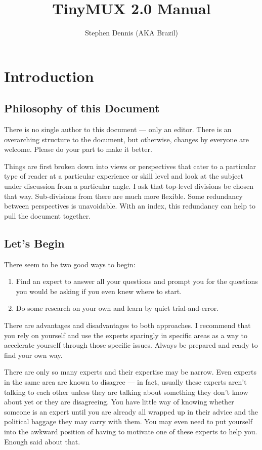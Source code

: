 \documentclass[letterpaper]{book}
\title{TinyMUX 2.0 Manual}
\author{Stephen Dennis (AKA Brazil)}
\begin{document}
\maketitle
\chapter{Introduction}
\section{Philosophy of this Document}
There is no single author to this document --- only an editor. There is an
overarching structure to the document, but otherwise, changes by everyone are
welcome. Please do your part to make it better.

Things are first broken down into views or perspectives that cater to a
particular type of reader at a particular experience or skill level and look
at the subject under discussion from a particular angle. I ask that top-level
divisions be chosen that way. Sub-divisions from there are much more flexible.
Some redundancy between perspectives is unavoidable. With an index, this
redundancy can help to pull the document together.
\section{Let's Begin}
There seem to be two good ways to begin:
\begin{enumerate}
\item
Find an expert to answer all your questions and prompt you for the questions
you would be asking if you even knew where to start.
\item
Do some research on your own and learn by quiet trial-and-error.
\end{enumerate}
There are advantages and disadvantages to both approaches. I recommend that
you rely on yourself and use the experts sparingly in specific areas as a way
to accelerate yourself through those specific issues. Always be prepared and
ready to find your own way.

There are only so many experts and their expertise may be narrow. Even experts
in the same area are known to disagree --- in fact, usually these experts
aren't talking to each other unless they are talking about something they don't
know about yet or they are disagreeing. You have little way of knowing whether
someone is an expert until you are already all wrapped up in their advice and
the political baggage they may carry with them. You may even need to put
yourself into the awkward position of having to motivate one of these experts
to help you. Enough said about that.
\end{document}
